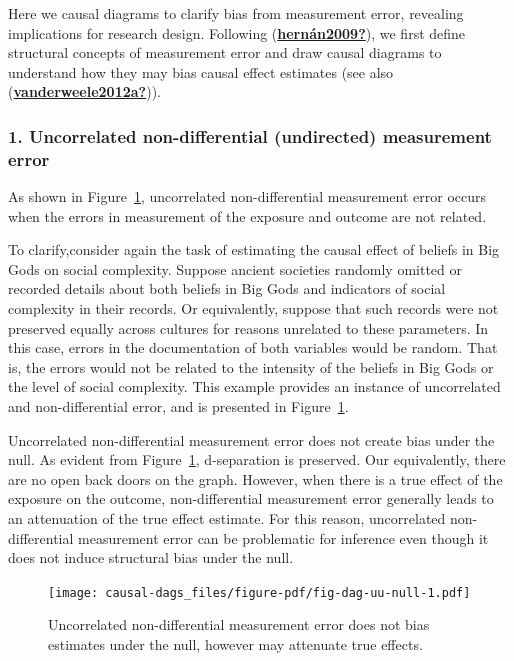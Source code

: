 \documentclass[
  singlecolumn]{report}
\begin{document}
Here we causal diagrams to clarify bias from measurement error,
revealing implications for research design. Following
(\protect\hyperlink{ref-hernuxe1n2009}{\textbf{hernán2009?}}), we first
define structural concepts of measurement error and draw causal diagrams
to understand how they may bias causal effect estimates (see also
(\protect\hyperlink{ref-vanderweele2012a}{\textbf{vanderweele2012a?}})).

\hypertarget{uncorrelated-non-differential-undirected-measurement-error}{%
\subsubsection{\texorpdfstring{1. \textbf{Uncorrelated non-differential
(undirected) measurement
error}}{1. Uncorrelated non-differential (undirected) measurement error}}\label{uncorrelated-non-differential-undirected-measurement-error}}

As shown in Figure~\ref{fig-dag-uu-null}, uncorrelated non-differential
measurement error occurs when the errors in measurement of the exposure
and outcome are not related.

To clarify,consider again the task of estimating the causal effect of
beliefs in Big Gods on social complexity. Suppose ancient societies
randomly omitted or recorded details about both beliefs in Big Gods and
indicators of social complexity in their records. Or equivalently,
suppose that such records were not preserved equally across cultures for
reasons unrelated to these parameters. In this case, errors in the
documentation of both variables would be random. That is, the errors
would not be related to the intensity of the beliefs in Big Gods or the
level of social complexity. This example provides an instance of
uncorrelated and non-differential error, and is presented in
Figure~\ref{fig-dag-uu-null}.

Uncorrelated non-differential measurement error does not create bias
under the null. As evident from Figure~\ref{fig-dag-uu-null},
d-separation is preserved. Our equivalently, there are no open back
doors on the graph. However, when there is a true effect of the exposure
on the outcome, non-differential measurement error generally leads to an
attenuation of the true effect estimate. For this reason, uncorrelated
non-differential measurement error can be problematic for inference even
though it does not induce structural bias under the null.

\begin{figure}

{\centering \texttt{[image: causal-dags\_files/figure-pdf/fig-dag-uu-null-1.pdf]}

}

\caption{\label{fig-dag-uu-null}Uncorrelated non-differential
measurement error does not bias estimates under the null, however may
attenuate true effects.}

\end{figure}
\end{document}
